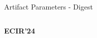 \documentclass[en,16:9,smallfoot]{sdqbeamer}
\begin{document}
\begin{frame}{Artifact Parameters - Digest}
\begin{columns}
           \begin{infobox-pub-small}
           \textbf{ECIR'24}~\cite{Saier2024HyperPIE}
           \end{infobox-pub-small}
   \end{columns}
   \end{frame}

\end{document}
